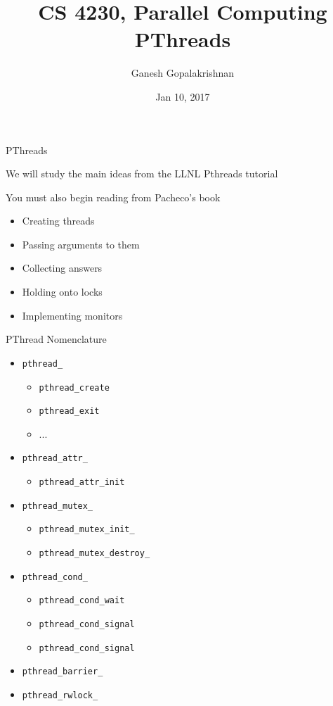 \documentclass{beamer}
\title[]{CS 4230, Parallel Computing\\
   PThreads}
\author{Ganesh Gopalakrishnan}
\institute{School of Computing, Univ of Utah}
\date{Jan 10, 2017}
\begin{document}
\begin{frame}
  \titlepage
\end{frame}




\begin{frame}{PThreads}

\noindent We will study the main ideas from the LLNL Pthreads tutorial

\noindent You must also begin reading from Pacheco's book
\begin{itemize}
\item Creating threads
\item Passing arguments to them
\item Collecting answers
\item Holding onto locks
\item Implementing monitors
\end{itemize}
 
\end{frame}


\begin{frame}[fragile]{PThread Nomenclature}

\begin{itemize}
\item \verb|pthread_|
  \begin{itemize}
  \item \verb|pthread_create|
  \item \verb|pthread_exit|
  \item ...
  \end{itemize}
\item \verb|pthread_attr_|
  \begin{itemize}
  \item \verb|pthread_attr_init|
  \end{itemize}
\item \verb|pthread_mutex_|
  \begin{itemize}
  \item \verb|pthread_mutex_init_|
  \item \verb|pthread_mutex_destroy_|
  \end{itemize}
\item \verb|pthread_cond_|
  \begin{itemize}
  \item \verb|pthread_cond_wait|
  \item \verb|pthread_cond_signal|
  \item \verb|pthread_cond_signal|
  \end{itemize}
\item \verb|pthread_barrier_|
\item \verb|pthread_rwlock_|
\end{itemize}
 
\end{frame}
\end{document}
